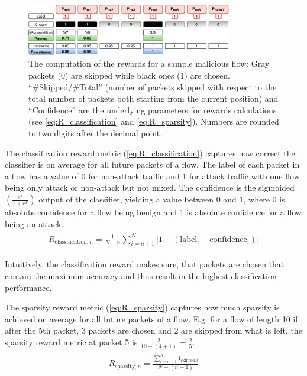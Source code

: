 \documentclass[conference]{IEEEtran}
\newcommand\note[2]{{\color{#1}#2}}
\begin{document}
\begin{figure}
\centering
  \includegraphics[width=0.8\textwidth]{img/rewards_calc_example.pdf}
  \caption{The computation of the rewards for a sample malicious flow: Gray packets (0) are skipped while black ones (1) are chosen. ``\#Skipped\//\#Total'' (number of packets skipped with respect to the total number of packets both starting from the current position) and ``Confidence'' are the underlying parameters for rewards calculations (see \autoref{eq:R_classification} and \autoref{eq:R_sparsity}). Numbers are rounded to two digits after the decimal point.}
  \label{fig:rewards}
\end{figure}

The classification reward metric (\autoref{eq:R_classification}) captures how correct the classifier is on average for all future packets of a flow. The label of each packet in a flow has a value of 0 for non-attack traffic and 1 for attack traffic with one flow being only attack or non-attack but not mixed. The confidence is the sigmoided $\left(\frac{e^x}{1+e^x}\right)$ output of the classifier, yielding a value between 0 and 1, where 0 is absolute confidence for a flow being benign and 1 is absolute confidence for a flow being an attack.
\begin{align}
\begin{split}
R_{\text{classification},n} = \frac{1}{N-n} \sum_{i=n+1}^{N} |1 - \left(\text{label}_i - \text{confidence}_i\right)|
\end{split}
\label{eq:R_classification}
\end{align}

Intuitively, the classification reward makes sure, that packets are chosen that contain the maximum accuracy and thus result in the highest classification performance.

The sparsity reward metric (\autoref{eq:R_sparsity}) captures how much sparsity is achieved on average for all future packets of a flow. E.g. for a flow of length 10 if after the 5th packet, 3 packets are chosen and 2 are skipped from what is left, the sparsity reward metric at packet 5 is $\frac{2}{10-(4+1)}=\frac{2}{5}$.
\begin{align}
\begin{split}
R_{\text{sparsity},n} = \frac{\sum_{i=n+1}^{N} 1_{\text{skipped},i}}{N-(n+1)}
\end{split}
\label{eq:R_sparsity}
\end{align}
\end{document}
